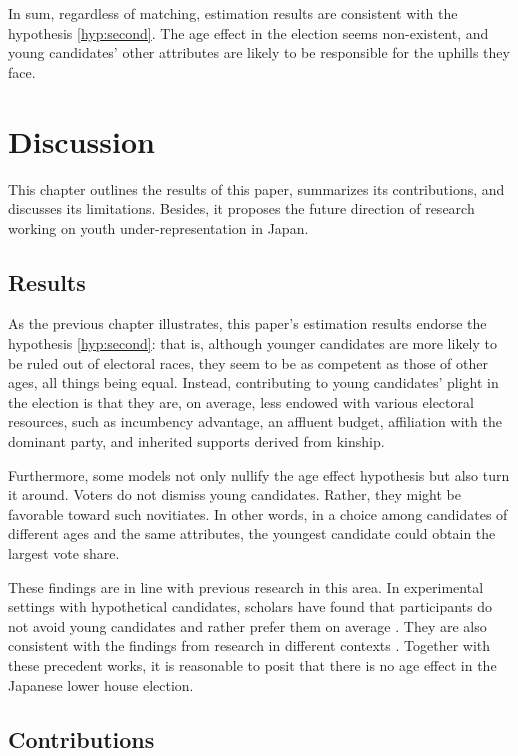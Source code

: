 \documentclass[a4paper, 12pt]{article}\usepackage[dvipdfmx]{graphicx}\usepackage[]{xcolor}
\begin{document}
In sum, regardless of matching, estimation results are consistent with the hypothesis \ref{hyp:second}. The age effect in the election seems non-existent, and young candidates' other attributes are likely to be responsible for the uphills they face. 

\section{Discussion} \label{ch6}

This chapter outlines the results of this paper, summarizes its contributions, and discusses its limitations. Besides, it proposes the future direction of research working on youth under-representation in Japan. 

\subsection{Results} \label{ch6.1}

As the previous chapter illustrates, this paper's estimation results endorse the hypothesis \ref{hyp:second}: that is, although younger candidates are more likely to be ruled out of electoral races, they seem to be as competent as those of other ages, all things being equal. Instead, contributing to young candidates' plight in the election is that they are, on average, less endowed with various electoral resources, such as incumbency advantage, an affluent budget, affiliation with the dominant party, and inherited supports derived from kinship. 

Furthermore, some models not only nullify the age effect hypothesis but also turn it around. Voters do not dismiss young candidates. Rather, they might be favorable toward such novitiates. In other words, in a choice among candidates of different ages and the same attributes, the youngest candidate could obtain the largest vote share. 

These findings are in line with previous research in this area. In experimental settings with hypothetical candidates, scholars have found that participants do not avoid young candidates and rather prefer them on average \citep{horiuchi2020identifying, eshima2022just, mcclean2022too}. They are also consistent with the findings from research in different contexts \citep{stockemer2023young}. Together with these precedent works, it is reasonable to posit that there is no age effect in the Japanese lower house election. 

\subsection{Contributions} \label{ch6.2}
\end{document}
